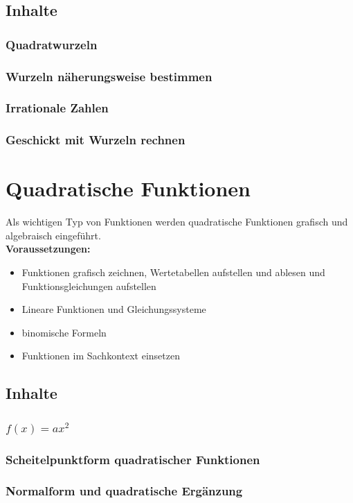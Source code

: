 \documentclass{article}
\begin{document}
\subsection{Inhalte}
\subsubsection*{Quadratwurzeln}
\subsubsection*{Wurzeln näherungsweise bestimmen}
\subsubsection*{Irrationale Zahlen}
\subsubsection*{Geschickt mit Wurzeln rechnen}
\newpage
\section{Quadratische Funktionen}
Als wichtigen Typ von Funktionen werden quadratische Funktionen grafisch und algebraisch eingeführt.\\
\textbf{Voraussetzungen:}
\begin{itemize}
    \item Funktionen grafisch zeichnen, Wertetabellen aufstellen und ablesen und Funktionsgleichungen aufstellen
    \item Lineare Funktionen und Gleichungssysteme
    \item binomische Formeln
    \item Funktionen im Sachkontext einsetzen
\end{itemize}
\subsection{Inhalte}
\subsubsection*{$f(x) = a x^2$}
\subsubsection*{Scheitelpunktform quadratischer Funktionen}
\subsubsection*{Normalform und quadratische Ergänzung}
\end{document}
